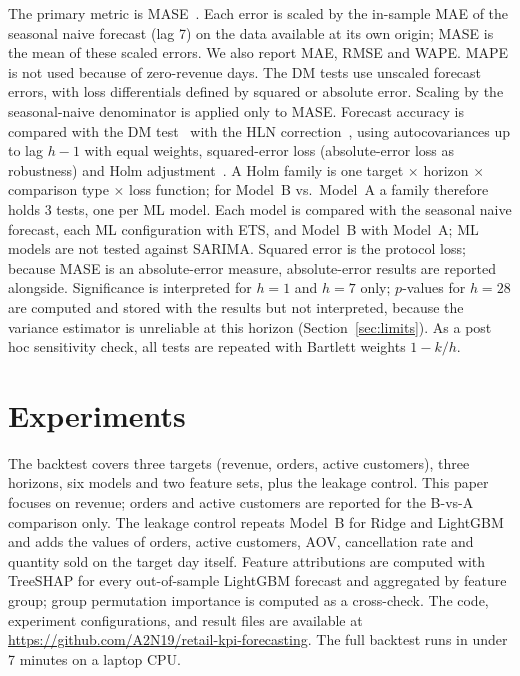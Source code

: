 \documentclass[conference]{IEEEtran}
\begin{document}
The primary metric is MASE~\cite{hyndman2006}. Each error is scaled by the in-sample MAE of the seasonal
naive forecast (lag 7) on the data available at its own origin; MASE is the mean of these scaled errors. We
also report MAE, RMSE and WAPE. MAPE is not used because of zero-revenue days. The DM tests use unscaled
forecast errors, with loss differentials defined by squared or absolute error. Scaling by the seasonal-naive
denominator is applied only to MASE. Forecast accuracy is compared with the DM test~\cite{diebold1995}
with the HLN correction~\cite{harvey1997}, using autocovariances up to lag
$h-1$ with equal weights, squared-error loss (absolute-error loss as robustness) and Holm
adjustment~\cite{holm1979}. A Holm family is one target $\times$ horizon $\times$ comparison type $\times$ loss
function; for Model~B vs.\ Model~A a family therefore holds 3 tests, one per ML model. %
Each model is compared with the seasonal naive forecast, each ML configuration with ETS, and Model~B with
Model~A; ML models are not tested against SARIMA. Squared error is the protocol loss; because MASE is an
absolute-error measure, absolute-error results are reported alongside. Significance is interpreted for $h=1$
and $h=7$ only; $p$-values for $h=28$ are computed and stored with the results but not interpreted, because
the variance estimator is unreliable at this horizon (Section~\ref{sec:limits}). As a post hoc sensitivity
check, all tests are repeated with Bartlett weights $1-k/h$.

\section{Experiments}
The backtest covers three targets (revenue, orders, active customers), three horizons, six models and two
feature sets, plus the leakage control. This paper focuses on revenue; orders and active customers are
reported for the B-vs-A comparison only. The leakage control repeats Model~B for Ridge and LightGBM and adds
the values of orders, active customers, AOV, cancellation rate and quantity sold on the target day itself. %
Feature attributions are computed with TreeSHAP for every out-of-sample LightGBM forecast and aggregated by feature group; group
permutation importance is computed as a cross-check. The code, experiment configurations, and result files are
available at \url{https://github.com/A2N19/retail-kpi-forecasting}. The full backtest
runs in under 7 minutes on a laptop CPU. %
\end{document}
